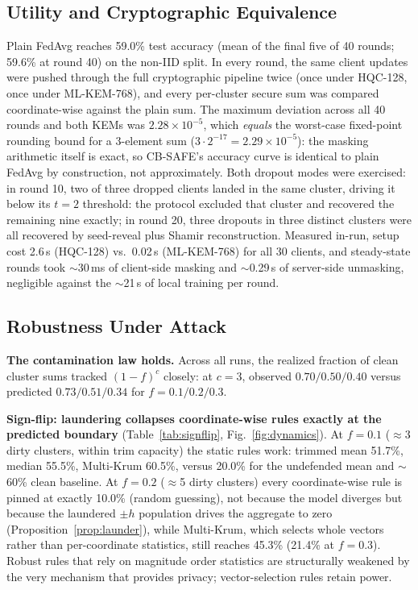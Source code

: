 \documentclass[lettersize,journal]{IEEEtran}
\begin{document}
\subsection{Utility and Cryptographic Equivalence}
Plain FedAvg reaches 59.0\% test accuracy (mean of the final five of 40 rounds;
59.6\% at round 40) on the non-IID split. In every round,
the same client updates were pushed through the full cryptographic pipeline twice
(once under HQC-128, once under ML-KEM-768), and every per-cluster secure sum was
compared coordinate-wise against the plain sum. The maximum deviation across all 40
rounds and both KEMs was $2.28\times10^{-5}$, which \emph{equals} the worst-case
fixed-point rounding bound for a 3-element sum ($3\cdot 2^{-17}=2.29\times10^{-5}$):
the masking arithmetic itself is exact, so CB-SAFE's accuracy curve is identical to
plain FedAvg by construction, not approximately. Both dropout modes were exercised:
in round 10, two of three dropped clients landed in the same cluster, driving it
below its $t{=}2$ threshold: the protocol excluded that cluster and recovered the
remaining nine exactly; in round 20, three dropouts in three distinct clusters were
all recovered by seed-reveal plus Shamir reconstruction. Measured in-run, setup cost
2.6\,s (HQC-128) vs.\ 0.02\,s (ML-KEM-768) for all 30 clients, and steady-state
rounds took $\sim$30\,ms of client-side masking and $\sim$0.29\,s of server-side
unmasking, negligible against the $\sim$21\,s of local training per round.

\subsection{Robustness Under Attack}
\textbf{The contamination law holds.} Across all runs, the realized fraction of
clean cluster sums tracked $(1-f)^c$ closely: at $c{=}3$, observed $0.70/0.50/0.40$
versus predicted $0.73/0.51/0.34$ for $f{=}0.1/0.2/0.3$.

\textbf{Sign-flip: laundering collapses coordinate-wise rules exactly at the
predicted boundary} (Table~\ref{tab:signflip}, Fig.~\ref{fig:dynamics}). At $f{=}0.1$ ($\approx$3 dirty
clusters, within trim capacity) the static rules work: trimmed mean 51.7\%, median
55.5\%, Multi-Krum 60.5\%, versus 20.0\% for the undefended mean and $\sim$60\% clean
baseline. At $f{=}0.2$ ($\approx$5 dirty clusters) every coordinate-wise rule is
pinned at exactly 10.0\% (random guessing), not because the model diverges but
because the laundered $\pm h$ population drives the aggregate to zero
(Proposition~\ref{prop:launder}), while Multi-Krum, which selects whole vectors
rather than per-coordinate statistics, still reaches 45.3\% (21.4\% at $f{=}0.3$).
Robust rules that rely on magnitude order statistics are structurally weakened by
the very mechanism that provides privacy; vector-selection rules retain power.
\end{document}

